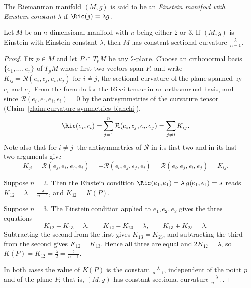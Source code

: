 \begin{definition}
\label{def:einstein-manifold}
\leanok
 The Riemannian manifold
$(M,g)$ is said to be an \textit{Einstein manifold with Einstein
constant} $\lambda$ if $\Ric(g)=\lambda g$.
\end{definition}

\begin{example}
\label{ex:einstein-dimension-2-3}
\leanok
 Let $M$ be an $n$-dimensional manifold with $n$ being either $2$ or $3$.
If $(M,g)$ is Einstein with Einstein constant $\lambda$, then $M$ has
constant sectional curvature $\frac{\lambda}{n-1}$.
\end{example}

\begin{proof}
\leanok
Fix $p\in M$ and let $P\subset T_pM$ be any $2$-plane. Choose an
orthonormal basis $\{e_1,\ldots,e_n\}$ of $T_pM$ whose first two
vectors span $P$, and write $K_{ij}={\mathcal R}(e_i,e_j,e_i,e_j)$
for $i\not=j$, the sectional curvature of the plane spanned by $e_i$
and $e_j$. From the formula for the Ricci tensor in an orthonormal
basis, and since ${\mathcal R}(e_i,e_i,e_i,e_i)=0$ by the
antisymmetries of the curvature tensor
(Claim~\ref{claim:curvature-symmetries-bianchi}),
$$\Ric(e_i,e_i)=\sum_{j=1}^n{\mathcal R}(e_i,e_j,e_i,e_j)
=\sum_{j\not=i}K_{ij}.$$
Note also that for $i\not=j$, the antisymmetries of ${\mathcal R}$
in its first two and in its last two arguments give
$$K_{ji}={\mathcal R}(e_j,e_i,e_j,e_i)
=-{\mathcal R}(e_i,e_j,e_j,e_i)
={\mathcal R}(e_i,e_j,e_i,e_j)=K_{ij}.$$

Suppose $n=2$. Then the Einstein condition
$\Ric(e_1,e_1)=\lambda\,g(e_1,e_1)=\lambda$ reads
$K_{12}=\lambda=\frac{\lambda}{n-1}$, and $K_{12}=K(P)$.

Suppose $n=3$. The Einstein condition applied to $e_1,e_2,e_3$ gives
the three equations
$$K_{12}+K_{13}=\lambda,\qquad K_{12}+K_{23}=\lambda,\qquad
K_{13}+K_{23}=\lambda.$$
Subtracting the second from the first gives $K_{13}=K_{23}$, and
subtracting the third from the second gives $K_{12}=K_{13}$. Hence
all three are equal and $2K_{12}=\lambda$, so
$K(P)=K_{12}=\frac{\lambda}{2}=\frac{\lambda}{n-1}$.

In both cases the value of $K(P)$ is the constant
$\frac{\lambda}{n-1}$, independent of the point $p$ and of the plane
$P$; that is, $(M,g)$ has constant sectional curvature
$\frac{\lambda}{n-1}$.
\end{proof}

